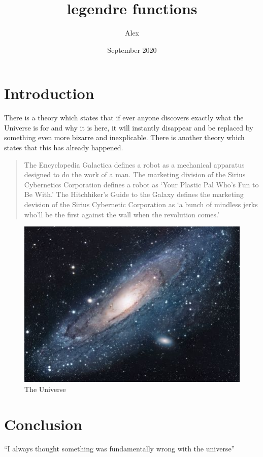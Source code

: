 \documentclass{article}
\title{legendre functions}
\author{Alex}
\date{September 2020}
\begin{document}
\maketitle

\section{Introduction}
There is a theory which states that if ever anyone discovers exactly what the Universe is for and why it is here, it will instantly disappear and be replaced by something even more bizarre and inexplicable.
There is another theory which states that this has already happened.

\begin{quote}
The Encyclopedia Galactica defines a robot as a mechanical apparatus designed to do the work of a man. The marketing division of the Sirius Cybernetics Corporation defines a robot as `Your Plastic Pal Who's Fun to Be With.' The Hitchhiker's Guide to the Galaxy defines the marketing devision of the Sirius Cybernetic Corporation as `a bunch of mindless jerks who'll be the first against the wall when the revolution comes.'
\end{quote}

\begin{figure}[h!]
\centering
\includegraphics[scale=1.7]{universe}
\caption{The Universe}
\label{fig:universe}
\end{figure}

\section{Conclusion}
``I always thought something was fundamentally wrong with the universe'' \citep{adams1995hitchhiker}



\end{document}
